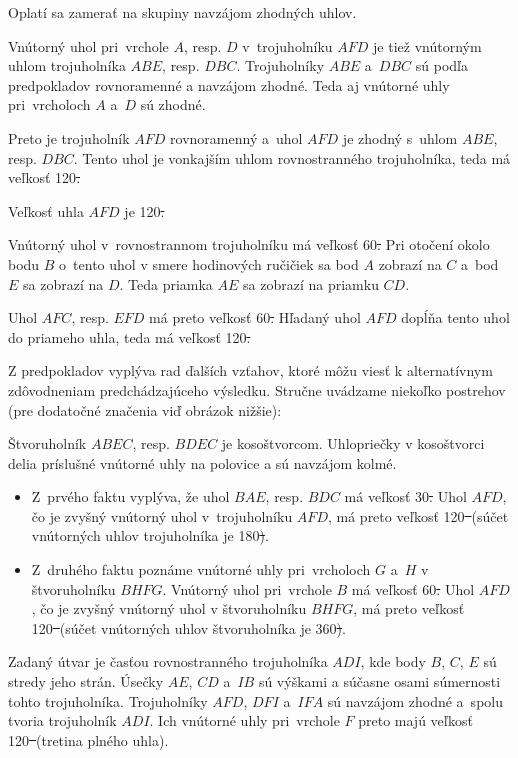 {%
\napad
Oplatí sa zamerať na skupiny navzájom zhodných uhlov.

\riesenie
Vnútorný uhol pri~vrchole $A$, resp. $D$ v~trojuholníku $AFD$ je tiež vnútorným uhlom trojuholníka $ABE$, resp. $DBC$.
Trojuholníky $ABE$ a~$DBC$ sú podľa predpokladov rovnoramenné a navzájom zhodné.
Teda aj vnútorné uhly pri~vrcholoch $A$ a~$D$ sú zhodné.

Preto je trojuholník $AFD$ rovnoramenný a~uhol $AFD$ je zhodný s~uhlom $ABE$, resp. $DBC$.
Tento uhol je vonkajším uhlom rovnostranného trojuholníka, teda má veľkosť 120\st.

Veľkosť uhla $AFD$ je 120\st.
%

\ineriesenie
Vnútorný uhol v~rovnostrannom trojuholníku má veľkosť 60\st.
Pri otočení okolo bodu $B$ o~tento uhol v smere hodinových ručičiek sa bod $A$ zobrazí na $C$ a~bod $E$ sa zobrazí na $D$.
Teda priamka $AE$ sa zobrazí na priamku $CD$.

Uhol $AFC$, resp. $EFD$ má preto veľkosť 60\st.
Hľadaný uhol $AFD$ dopĺňa tento uhol do priameho uhla, teda má veľkosť 120\st.

\poznamky
Z predpokladov vyplýva rad ďalších vzťahov, ktoré môžu viesť k alternatívnym zdôvodneniam predchádzajúceho výsledku.
Stručne uvádzame niekoľko postrehov (pre dodatočné značenia viď obrázok nižšie):

Štvoruholník $ABEC$, resp. $BDEC$ je kosoštvorcom.
Uhlopriečky v kosoštvorci delia príslušné vnútorné uhly na polovice a sú navzájom kolmé.
\begin{itemize}
\item
Z~prvého faktu vyplýva, že uhol $BAE$, resp. $BDC$ má veľkosť 30\st.
Uhol $AFD$, čo je zvyšný vnútorný uhol v~trojuholníku $AFD$, má preto veľkosť 120\st\
(súčet vnútorných uhlov trojuholníka je 180\st).
\item
Z~druhého faktu poznáme vnútorné uhly pri~vrcholoch $G$ a~$H$ v štvoruholníku $BHFG$.
Vnútorný uhol pri~vrchole $B$ má veľkosť 60\st.
Uhol $AFD$, čo je zvyšný vnútorný uhol v štvoruholníku $BHFG$, má preto veľkosť 120\st\
(súčet vnútorných uhlov štvoruholníka je 360\st).
\end{itemize}

Zadaný útvar je časťou rovnostranného trojuholníka $ADI$, kde body $B$, $C$, $E$ sú stredy jeho strán.
Úsečky $AE$, $CD$ a~$IB$ sú výškami a súčasne osami súmernosti tohto trojuholníka.
Trojuholníky $AFD$, $DFI$ a~$IFA$ sú navzájom zhodné a~spolu tvoria trojuholník $ADI$.
Ich vnútorné uhly pri~vrchole $F$ preto majú veľkosť 120\st\
(tretina plného uhla).
\insp{z7-I-2c.eps}%
}

